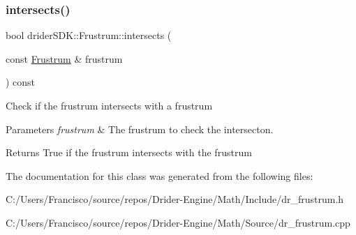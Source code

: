 \subsubsection{\texorpdfstring{intersects()}{intersects()}\hspace{0.1cm}{\footnotesize\ttfamily [5/5]}}
{\footnotesize\ttfamily bool drider\+S\+D\+K\+::\+Frustrum\+::intersects (\begin{DoxyParamCaption}\item[{const \hyperlink{classdrider_s_d_k_1_1_frustrum}{Frustrum} \&}]{frustrum }\end{DoxyParamCaption}) const}

Check if the frustrum intersects with a frustrum


\begin{DoxyParams}{Parameters}
{\em frustrum} & The frustrum to check the intersecton.\\
\hline
\end{DoxyParams}
\begin{DoxyReturn}{Returns}
True if the frustrum intersects with the frustrum 
\end{DoxyReturn}


The documentation for this class was generated from the following files\+:\begin{DoxyCompactItemize}
\item 
C\+:/\+Users/\+Francisco/source/repos/\+Drider-\/\+Engine/\+Math/\+Include/dr\+\_\+frustrum.\+h\item 
C\+:/\+Users/\+Francisco/source/repos/\+Drider-\/\+Engine/\+Math/\+Source/dr\+\_\+frustrum.\+cpp\end{DoxyCompactItemize}
